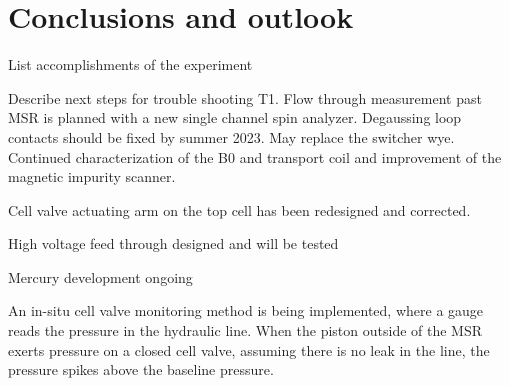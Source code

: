 
\chapter{Conclusions and outlook}\label{chap:conclusion}


List accomplishments of the experiment

Describe next steps for trouble shooting T1. Flow through measurement past MSR is planned with a new single channel spin analyzer. Degaussing loop contacts should be fixed by summer 2023. May replace the switcher wye. Continued characterization of the B0 and transport coil and improvement of the magnetic impurity scanner.

Cell valve actuating arm on the top cell has been redesigned and corrected.

High voltage feed through designed and will be tested

Mercury development ongoing



An in-situ cell valve monitoring method is being implemented, where a gauge reads the pressure in the hydraulic line. When the piston outside of the MSR exerts pressure on a closed cell valve, assuming there is no leak in the line, the pressure spikes above the baseline pressure.